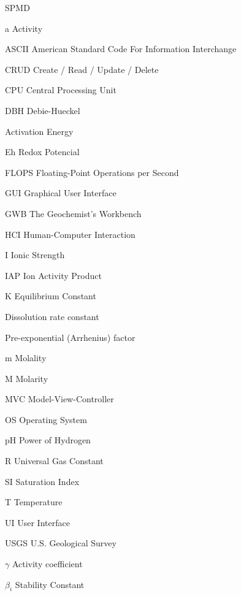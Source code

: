 \documentclass[ppgc,mestrado,english]{iiufrgs}
\begin{document}
\begin{listofabbrv}{SPMD}
\item[a] Activity
\item[ASCII] American Standard Code For Information Interchange
\item[CRUD] Create / Read / Update / Delete
\item[CPU] Central Processing Unit
\item[DBH] Debie-Hueckel 
\item[\ce{E_a}] Activation Energy
\item[Eh] Redox Potencial
\item[FLOPS] Floating-Point Operations per Second
\item[GUI] Graphical User Interface
\item[GWB] The Geochemist's Workbench
\item[HCI] Human-Computer Interaction        
\item[I] Ionic Strength
\item[IAP] Ion Activity Product 
\item[K] Equilibrium Constant        
\item[\ce{k_{diss}}] Dissolution rate constant
\item[\ce{k_0}] Pre-exponential (Arrhenius) factor
\item[m] Molality
\item[M] Molarity
\item[MVC] Model-View-Controller
\item[OS] Operating System
\item[pH] Power of Hydrogen
\item[R] Universal Gas Constant
\item[SI] Saturation Index 
\item[T] Temperature
\item[UI] User Interface
\item[USGS] U.S. Geological Survey
\item[$\gamma$] Activity coefficient
\item[$\beta_i$] Stability Constant         
\end{listofabbrv}


\end{document}
